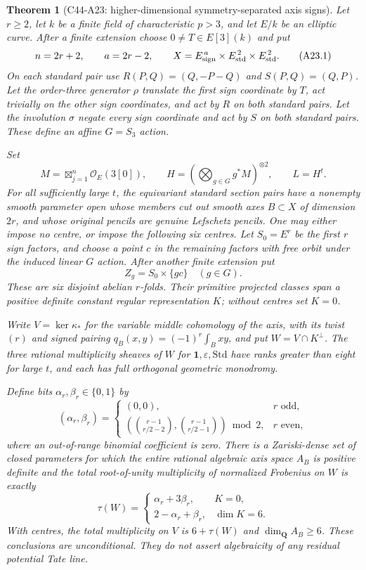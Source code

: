 \documentclass[11pt]{article}
\newtheorem{theorem}{Theorem}[section]
\theoremstyle{remark}\newtheorem{remark}[theorem]{Remark}
\begin{document}
\begin{theorem}[C44-A23: higher-dimensional symmetry-separated axis signs]
Let $r\geq2$, let $k$ be a finite field of characteristic $p>3$, and let
$E/k$ be an elliptic curve.  After a finite extension choose
$0\ne T\in E[3](k)$ and put
\[
 n=2r+2,\qquad a=2r-2,\qquad
 X=E_{\rm sign}^{\,a}\times E_{\rm std}^{\,2}\times E_{\rm std}^{\,2}.
 \tag{A23.1}
\]
On each standard pair use
$R(P,Q)=(Q,-P-Q)$ and $S(P,Q)=(Q,P)$.
Let the order-three generator $\rho$ translate the first sign coordinate
by $T$, act trivially on the other sign coordinates, and act by $R$ on
both standard pairs.  Let the involution $\sigma$ negate every sign
coordinate and act by $S$ on both standard pairs.  These define an
affine $G=S_3$ action.

Set
\[
 M=\mathop{\boxtimes}_{j=1}^{n}\mathcal O_E(3[0]),\qquad
 H=\left(\bigotimes_{g\in G}g^*M\right)^{\otimes2},\qquad L=H^t.
 \tag{A23.2}
\]
For all sufficiently large $t$, the equivariant standard section pairs
have a nonempty smooth parameter open whose members cut out smooth
axes $B\subset X$ of dimension $2r$, and whose original pencils are
genuine Lefschetz pencils.  One may either impose no centre, or impose
the following six centres.  Let $S_0=E^r$ be the first $r$ sign factors,
and choose a point $c$ in the remaining factors with free orbit under
the induced linear $G$ action.  After another finite extension put
\[
                       Z_g=S_0\times\{gc\}\quad(g\in G).
 \tag{A23.3}
\]
These are six disjoint abelian $r$-folds.  Their primitive projected
classes span a positive definite constant regular representation $K$;
without centres set $K=0$.

Write $V=\ker\kappa_*$ for the variable middle cohomology of the axis,
with its twist $(r)$ and signed pairing
$q_B(x,y)=(-1)^r\int_Bxy$, and put $W=V\cap K^\perp$.
The three rational multiplicity sheaves of $W$ for
$\mathbf1,\varepsilon,\mathrm{Std}$ have ranks greater than eight for
large $t$, and each has full orthogonal geometric monodromy.

Define bits $\alpha_r,\beta_r\in\{0,1\}$ by
\[
 (\alpha_r,\beta_r)=
 \begin{cases}
 (0,0),&r\text{ odd},\\
 \left(\binom{r-1}{r/2-2},\binom{r-1}{r/2-1}\right)\bmod2,
       &r\text{ even},
 \end{cases}
 \tag{A23.4}
\]
where an out-of-range binomial coefficient is zero.
There is a Zariski-dense set of closed parameters for which the entire
rational algebraic axis space $A_B$ is positive definite and the total
root-of-unity multiplicity of normalized Frobenius on $W$ is exactly
\[
 \tau(W)=
 \begin{cases}
 \alpha_r+3\beta_r,&K=0,\\
 2-\alpha_r+\beta_r,&\dim K=6.
 \end{cases}
 \tag{A23.5}
\]
With centres, the total multiplicity on $V$ is $6+\tau(W)$ and
$\dim_{\mathbf Q}A_B\geq6$.  These conclusions are unconditional.
They do not assert algebraicity of any residual potential Tate line.
\end{theorem}
\end{document}
